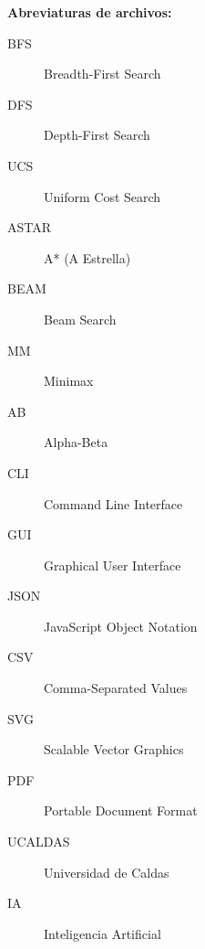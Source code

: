 \vspace{1cm}
\textbf{Abreviaturas de archivos:}
\begin{description}
\item[BFS] Breadth-First Search
\item[DFS] Depth-First Search
\item[UCS] Uniform Cost Search
\item[ASTAR] A* (A Estrella)
\item[BEAM] Beam Search
\item[MM] Minimax
\item[AB] Alpha-Beta
\item[CLI] Command Line Interface
\item[GUI] Graphical User Interface
\item[JSON] JavaScript Object Notation
\item[CSV] Comma-Separated Values
\item[SVG] Scalable Vector Graphics
\item[PDF] Portable Document Format
\item[UCALDAS] Universidad de Caldas
\item[IA] Inteligencia Artificial
\end{description}